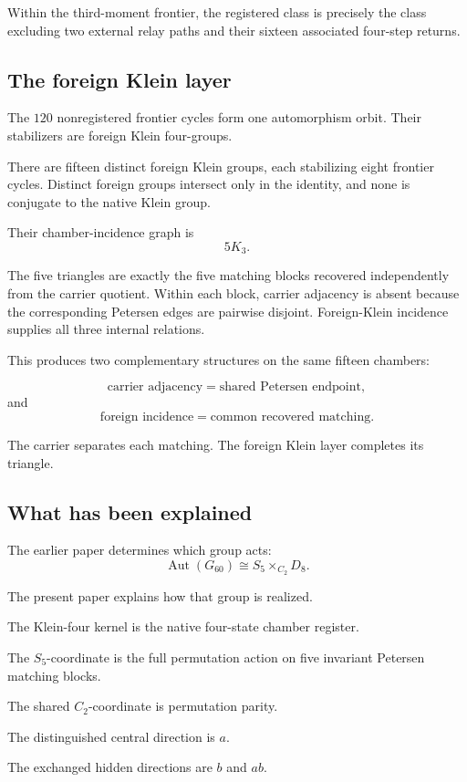 Within the third-moment frontier, the registered class is precisely
the class excluding two external relay paths and their sixteen
associated four-step returns.

\subsection{The foreign Klein layer}

The \(120\) nonregistered frontier cycles form one automorphism orbit.
Their stabilizers are foreign Klein four-groups.

There are fifteen distinct foreign Klein groups, each stabilizing
eight frontier cycles. Distinct foreign groups intersect only in the
identity, and none is conjugate to the native Klein group.

Their chamber-incidence graph is
\[
5K_3.
\]

The five triangles are exactly the five matching blocks recovered
independently from the carrier quotient. Within each block, carrier
adjacency is absent because the corresponding Petersen edges are
pairwise disjoint. Foreign-Klein incidence supplies all three internal
relations.

This produces two complementary structures on the same fifteen
chambers:

\[
\text{carrier adjacency}
=
\text{shared Petersen endpoint},
\]
and
\[
\text{foreign incidence}
=
\text{common recovered matching}.
\]

The carrier separates each matching. The foreign Klein layer completes
its triangle.

\subsection{What has been explained}

The earlier paper determines which group acts:
\[
\operatorname{Aut}(G_{60})
\cong
S_5\times_{C_2}D_8.
\]

The present paper explains how that group is realized.

The Klein-four kernel is the native four-state chamber register.

The \(S_5\)-coordinate is the full permutation action on five invariant
Petersen matching blocks.

The shared \(C_2\)-coordinate is permutation parity.

The distinguished central direction is \(a\).

The exchanged hidden directions are \(b\) and \(ab\).

